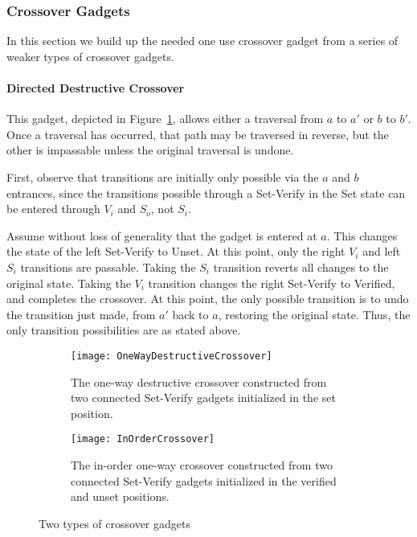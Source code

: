 \subsubsection{Crossover Gadgets}
In this section we build up the needed one use crossover gadget from a series of weaker types of crossover gadgets.

\paragraph{Directed Destructive Crossover} This gadget, depicted in Figure~\ref{DestructiveCrossover}, allows either a traversal from $a$ to $a'$ or $b$ to $b'$. Once a traversal has occurred, that path may be traversed in reverse, but the other is impassable unless the original traversal is undone.

First, observe that transitions are initially only possible via the $a$ and $b$ entrances, since the transitions possible through a Set-Verify in the Set state can be entered through $V_i$ and $S_o$, not $S_i$.

Assume without loss of generality that the gadget is entered at $a$. This changes the state of the left Set-Verify to Unset. At this point, only the right $V_i$ and left $S_i$ transitions are passable. Taking the $S_i$ transition reverts all changes to the original state. Taking the $V_i$ transition changes the right Set-Verify to Verified, and completes the crossover. At this point, the only possible transition is to undo the transition just made, from $a'$ back to $a$, restoring the original state. Thus, the only transition possibilities are as stated above.

\begin{figure}[!ht]
  \centering
  \begin{subfigure}[b]{0.45\textwidth}
    \texttt{[image: OneWayDestructiveCrossover]}
    \caption{The one-way destructive crossover constructed from two connected Set-Verify gadgets initialized in the set position.}
    \label{DestructiveCrossover}
  \end{subfigure}
  \hfill
  \begin{subfigure}[b]{0.45\textwidth}
    \texttt{[image: InOrderCrossover]}
    \caption{The in-order one-way crossover constructed from two connected Set-Verify gadgets initialized in the verified and unset positions.}
    \label{InOrderCrossover}
  \end{subfigure}
  \caption{Two types of crossover gadgets}
\end{figure}

